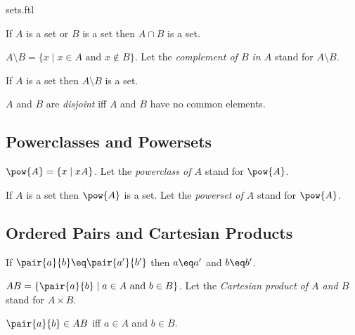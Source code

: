 \documentclass{naproche-library}
\begin{document}
\begin{smodule}{sets.ftl}
\begin{proposition*}[forthel,id=IntersectionProp,printid]
  If $A$ is a set or $B$ is a set then $A\cap B$ is a set.
\end{proposition*}

\begin{definition*}[forthel,id=ComplementDef,printid]
  $A\setminus B=\{x\mid x\in A\text{ and }x\notin B\}$.
  Let the \emph{complement of $B$ in $A$} stand for $A\setminus B$.
\end{definition*}

\begin{proposition*}[forthel,id=ComplementProp,printid]
  If $A$ is a set then $A\setminus B$ is a set.
\end{proposition*}

\begin{definition*}[forthel,id=DisjointDef,printid]
  $A$ and $B$ are \emph{disjoint} iff $A$ and $B$ have no common elements.
\end{definition*}


\subsection{Powerclasses and Powersets}

\begin{definition*}[forthel,id=PowerclassDef,printid]
  $\pow{A}=\{x\mid x\subseteq A\}$.
  Let the \emph{powerclass of $A$} stand for $\pow{A}$.
\end{definition*}

\begin{axiom*}[forthel,title=Powerset Axiom,id=PowersetAx,printid]
  If $A$ is a set then $\pow{A}$ is a set.
  Let the \emph{powerset of $A$} stand for $\pow{A}$.
\end{axiom*}


\subsection{Ordered Pairs and Cartesian Products}

\begin{axiom*}[forthel,title=Pair Extensionality Axiom,id=PairExtensionalityAx,printid]
  If $\pair{a}{b}\eq \pair{a'}{b'}$ then $a\eq a'$ and $b\eq b'$.
\end{axiom*}

\begin{definition*}[forthel,id=CartesianProductDef,printid]
  $A\times B=\{\pair{a}{b}\mid a\in A\text{ and }b\in B\}$.
  Let the \emph{Cartesian product of $A$ and $B$} stand for $A\times B$.
\end{definition*}

\begin{proposition*}[forthel,id=CartesianProductProp,printid]
  $\pair{a}{b}\in A\times B$ iff $a\in A$ and $b\in B$.
\end{proposition*}
\end{smodule}
\end{document}
